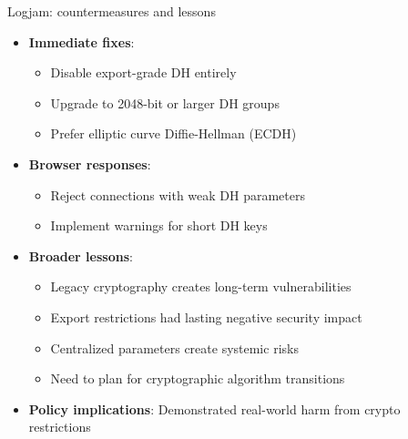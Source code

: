 \ifdefined\PRESENTATION\else\PassOptionsToClass{handout}{beamer}\fi\documentclass[aspectratio=169, lualatex]{beamer}
\begin{document}
\begin{frame}{Logjam: countermeasures and lessons}
	\begin{itemize}
		\item \textbf{Immediate fixes}:
		      \begin{itemize}
			      \item Disable export-grade DH entirely
			      \item Upgrade to 2048-bit or larger DH groups
			      \item Prefer elliptic curve Diffie-Hellman (ECDH)
		      \end{itemize}
		\item \textbf{Browser responses}:
		      \begin{itemize}
			      \item Reject connections with weak DH parameters
			      \item Implement warnings for short DH keys
		      \end{itemize}
		\item \textbf{Broader lessons}:
		      \begin{itemize}
			      \item Legacy cryptography creates long-term vulnerabilities
			      \item Export restrictions had lasting negative security impact
			      \item Centralized parameters create systemic risks
			      \item Need to plan for cryptographic algorithm transitions
		      \end{itemize}
		\item \textbf{Policy implications}: Demonstrated real-world harm from crypto restrictions
	\end{itemize}
\end{frame}
\end{document}
